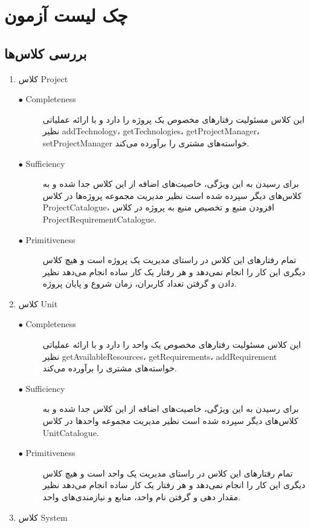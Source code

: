 \chapter{چک لیست آزمون}

\section{بررسی کلاس‌ها}
\begin{enumerate}
\item کلاس Project

\begin{description}
\item[$\bullet$ Completeness]  این کلاس مسئولیت رفتارهای مخصوص یک پروژه را دارد و با ارائه عملیاتی نظیر addTechnology، getTechnologies، getProjectManager، setProjectManager خواسته‌های مشتری را برآورده می‌کند.
\par
\item[$\bullet$ Sufficiency] برای رسیدن به این ویژگی، خاصیت‌های اضافه از این کلاس جدا شده و به کلاس‌های دیگر سپرده شده است نظیر مدیریت مجموعه پروژه‌ها در کلاس ProjectCatalogue، افزودن منبع و تخصیص منبع به پروژه در کلاس ProjectRequirementCatalogue.
\par
\item[$\bullet$ Primitiveness] تمام رفتارهای این کلاس در راستای مدیریت یک پروژه است و هیچ کلاس دیگری این کار را انجام نمی‌دهد و هر رفتار یک کار ساده انجام می‌دهد نظیر دادن و گرفتن تعداد کاربران، زمان شروع و پایان پروژه.
\end{description}

\item کلاس Unit
\begin{description}
\item[$\bullet$ Completeness]  این کلاس مسئولیت رفتارهای مخصوص یک واحد را دارد و با ارائه عملیاتی نظیر getAvailableResources، getRequirements، addRequirement خواسته‌های مشتری را برآورده می‌کند.
\par
\item[$\bullet$ Sufficiency] برای رسیدن به این ویژگی، خاصیت‌های اضافه از این کلاس جدا شده و به کلاس‌های دیگر سپرده شده است نظیر مدیریت مجموعه واحدها در کلاس UnitCatalogue.
\par
\item[$\bullet$ Primitiveness] تمام رفتارهای این کلاس در راستای مدیریت یک واحد است و هیچ کلاس دیگری این کار را انجام نمی‌دهد و هر رفتار یک کار ساده انجام می‌دهد نظیر مقدار دهی و گرفتن نام واحد، منابع و نیازمندی‌های واحد.
\end{description}
\item کلاس System


\end{enumerate}
